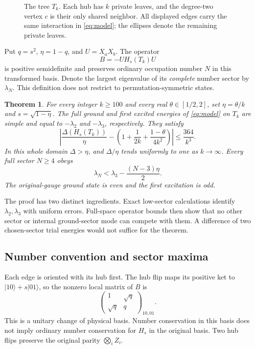\documentclass[11pt]{article}
\newtheorem{theorem}{Theorem}
\newcommand{\ket}[1]{|#1\rangle}
\begin{document}
\begin{figure}[htbp]
 \centering
 
 \caption{The tree $T_k$. Each hub has $k$ private leaves, and the
 degree-two vertex $c$ is their only shared neighbor. All displayed
 edges carry the same interaction in \eqref{eq:model}; the ellipses
 denote the remaining private leaves.}
 \label{fig:tree}
\end{figure}

Put $q=s^2$, $\eta=1-q$, and $U=X_aX_b$. The operator
\begin{equation}
 B=-UH_s(T_k)U
 \label{eq:B}
\end{equation}
is positive semidefinite and preserves ordinary occupation number $N$
in this transformed basis. Denote the largest eigenvalue of its
\emph{complete} number sector by $\lambda_N$. This definition does not
restrict to permutation-symmetric states.

\begin{theorem}
For every integer $k\geq100$ and every real $\theta\in[1/2,2]$, set
$\eta=\theta/k$ and $s=\sqrt{1-\eta}$. The full ground and first
excited energies of \eqref{eq:model} on $T_k$ are simple and equal to
$-\lambda_2$ and $-\lambda_3$, respectively. They satisfy
\begin{equation}
 \left|\frac{\Delta(H_s(T_k))}{\eta}
       -\left(1+\frac1{2k}+\frac{1-\theta}{4k^2}\right)\right|
 \leq\frac{364}{k^3}.
 \label{eq:gap}
\end{equation}
In this whole domain $\Delta>\eta$, and $\Delta/\eta$ tends uniformly
to one as $k\to\infty$. Every full sector $N\geq4$ obeys
\begin{equation}
 \lambda_N<\lambda_3-\frac{(N-3)\eta}{2}.
 \label{eq:tail}
\end{equation}
The original-gauge ground state is even and the first excitation is odd.
\label{thm:gap}
\end{theorem}

The proof has two distinct ingredients. Exact low-sector calculations
identify $\lambda_2,\lambda_3$ with uniform errors. Full-space operator
bounds then show that no other sector or internal ground-sector mode
can compete with them. A difference of two chosen-sector trial energies
would not suffice for the theorem.

\subsection{Number convention and sector maxima}

Each edge is oriented with its hub first. The hub flip maps its positive
ket to $\ket{10}+s\ket{01}$, so the nonzero local matrix of $B$ is
\begin{equation}
 \begin{pmatrix}1&\sqrt q\\ \sqrt q&q\end{pmatrix}_{10,01}.
 \label{eq:local}
\end{equation}
This is a unitary change of physical basis. Number conservation in this
basis does not imply ordinary number conservation for $H_s$ in the
original basis. Two hub flips preserve the original parity
$\bigotimes_i Z_i$.
\end{document}
